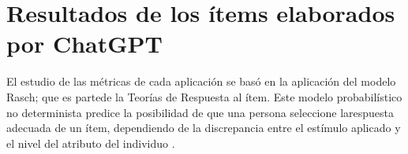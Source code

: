 \section{Resultados de los ítems elaborados por ChatGPT}\label{appdx1}


El estudio de las métricas de cada
aplicación se basó en la aplicación del modelo Rasch; que es partede la Teorías de Respuesta al ítem. Este modelo probabilístico no
determinista predice la posibilidad de que una persona seleccione larespuesta adecuada de un ítem, dependiendo de la discrepancia entre
el estímulo aplicado y el nivel del atributo del individuo \cite{Tristan1998}.

\newlength{\originalLTleft}
\setlength{\originalLTleft}{\LTleft}
\newlength{\originalLTright}
\setlength{\originalLTright}{\LTright}
\setlength\LTleft{-2cm}
\setlength\LTright{-2cm}
